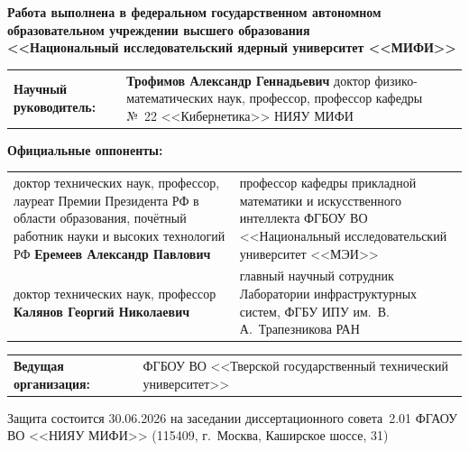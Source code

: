 \documentclass[12pt,a5paper]{article}
\begin{document}
{\footnotesize
\begin{center}
\textbf{Работа выполнена в федеральном государственном автономном\\
образовательном учреждении высшего образования\\
<<Национальный исследовательский ядерный университет <<МИФИ>>}
\end{center}

\vspace{0.2cm}

\noindent\begin{tabular}{@{}p{3cm}p{7.2cm}@{}}
\textbf{Научный руководитель:} & \textbf{Трофимов Александр Геннадьевич} \newline доктор физико-математических наук, профессор, профессор кафедры №~22 <<Кибернетика>> НИЯУ МИФИ \\
\end{tabular}

\vspace{0.2cm}

\noindent\textbf{Официальные оппоненты:}
\vspace{0.05cm}

\noindent\begin{tabular}{@{}p{3cm}p{7.2cm}@{}}
доктор технических наук, профессор, лауреат Премии Президента РФ в области образования, почётный работник науки и высоких технологий РФ \newline \textbf{Еремеев Александр Павлович} &
профессор кафедры прикладной математики и искусственного интеллекта ФГБОУ ВО <<Национальный исследовательский университет <<МЭИ>> \\[0.15cm]

доктор технических наук, профессор \newline \textbf{Калянов Георгий Николаевич} &
главный научный сотрудник Лаборатории инфраструктурных систем, ФГБУ ИПУ им.~В.\,А.~Трапезникова РАН \\
\end{tabular}

\vspace{0.2cm}

\noindent\begin{tabular}{@{}p{3cm}p{7.2cm}@{}}
\textbf{Ведущая организация:} & ФГБОУ ВО <<Тверской государственный технический университет>> \\
\end{tabular}

\vspace{0.2cm}

\noindent Защита состоится 30.06.2026 на заседании диссертационного совета~2.01 ФГАОУ ВО <<НИЯУ МИФИ>> (115409, г.~Москва, Каширское шоссе, 31)

}
\end{document}
